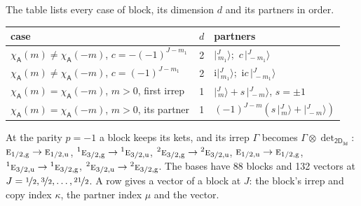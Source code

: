\documentclass[10pt,a4paper]{article}
\numberwithin{equation}{section}
\newcommand{\grp}[1]{\mathsf{#1}}
\newcommand{\irr}[1]{\text{\normalfont\scshape #1}}
\newcommand{\conjpair}[1]{{}^{#1}}
\newcommand{\ptag}[1]{\mathrm{#1}}
\newcommand{\iunit}{\mathrm{i}}
\newcommand{\chiA}{\chi_{\grp{A}}}
\newcommand{\irrprod}{\otimes}
\newcommand{\mult}{\kappa}
\newcommand{\intx}{\mu}
\newcommand{\jm}[2]{\bigl\lvert{}^{#1}_{\,#2}\bigr\rangle}
\begin{document}
\leavevmode\label{n:head.case}\label{n:head.partners}The table lists every case of block, its dimension $d$ and its partners in order.
\begin{center}\begin{tabular}{@{}lrl@{}}\toprule
case & $d$ & partners\\\midrule
$\chiA(m) \ne \chiA(-m)$, $c = -(-1)^{J-m_1}$ & 2 & $\jm{J}{m_1}$;\ $c\,\jm{J}{-m_1}$\\
$\chiA(m) \ne \chiA(-m)$, $c = (-1)^{J-m_1}$ & 2 & $\iunit\jm{J}{m_1}$;\ $\iunit c\,\jm{J}{-m_1}$\\
$\chiA(m) = \chiA(-m)$, $m > 0$, first irrep & 1 & $\jm{J}{m} + s\,\jm{J}{-m}$, $s = \pm1$\\
$\chiA(m) = \chiA(-m)$, $m > 0$, its partner & 1 & $(-1)^{J-m}(s\,\jm{J}{m} + \jm{J}{-m})$\\
\bottomrule\end{tabular}\end{center}
At the parity $p = -1$ a block keeps its kets, and its irrep $\Gamma$ becomes $\Gamma \irrprod \det_{\grp{2D_{3d}}}$: $\irr{e}_{1/2,\ptag{g}} \to \irr{e}_{1/2,\ptag{u}}$, $\conjpair{1}\irr{e}_{3/2,\ptag{g}} \to \conjpair{1}\irr{e}_{3/2,\ptag{u}}$, $\conjpair{2}\irr{e}_{3/2,\ptag{g}} \to \conjpair{2}\irr{e}_{3/2,\ptag{u}}$, $\irr{e}_{1/2,\ptag{u}} \to \irr{e}_{1/2,\ptag{g}}$, $\conjpair{1}\irr{e}_{3/2,\ptag{u}} \to \conjpair{1}\irr{e}_{3/2,\ptag{g}}$, $\conjpair{2}\irr{e}_{3/2,\ptag{u}} \to \conjpair{2}\irr{e}_{3/2,\ptag{g}}$.
The bases have 88 blocks and 132 vectors at $J = \nicefrac{1}{2}, \nicefrac{3}{2}, \dots, \nicefrac{21}{2}$. \label{n:head.vector}A row gives a vector of a block at $J$: the block's irrep and copy index $\mult$, the partner index $\intx$ and the vector.
\end{document}
